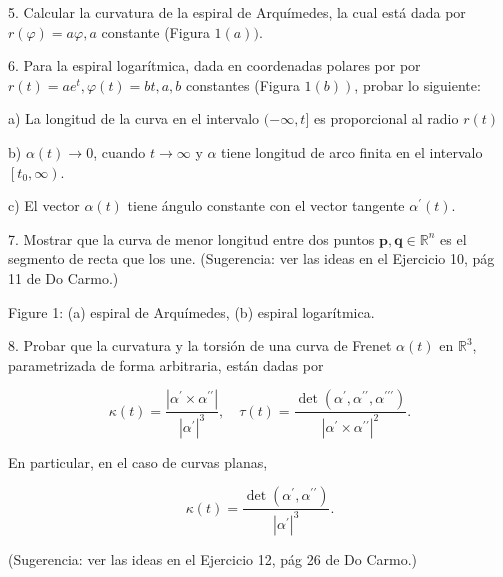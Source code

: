 \begin{problema}

5. Calcular la curvatura de la espiral de Arquímedes, la cual está dada por $r(\varphi)=a \varphi, a$ constante (Figura $1(a))$.
\end{problema}

\begin{problema}

6. Para la espiral logarítmica, dada en coordenadas polares por por $r(t)=a e^{t}, \varphi(t)=b t, a, b$ constantes (Figura $\left.1(b)\right)$, probar lo siguiente:

a) La longitud de la curva en el intervalo $(-\infty, t]$ es proporcional al radio $r(t)$

b) $\alpha(t) \rightarrow 0$, cuando $t \rightarrow \infty$ y $\alpha$ tiene longitud de arco finita en el intervalo $\left[t_{0}, \infty\right)$.

c) El vector $\alpha(t)$ tiene ángulo constante con el vector tangente $\alpha^{\prime}(t)$.


\end{problema}

\begin{problema}
    7. Mostrar que la curva de menor longitud entre dos puntos $\mathbf{p}, \mathbf{q} \in \mathbb{R}^{n}$ es el segmento de recta que los une. (Sugerencia: ver las ideas en el Ejercicio 10, pág 11 de Do Carmo.) 


Figure 1: (a) espiral de Arquímedes, (b) espiral logarítmica.

\end{problema}

\begin{problema}


8. Probar que la curvatura y la torsión de una curva de Frenet $\alpha(t)$ en $\mathbb{R}^{3}$, parametrizada de forma arbitraria, están dadas por

$$
\kappa(t)=\frac{\left|\alpha^{\prime} \times \alpha^{\prime \prime}\right|}{\left|\alpha^{\prime}\right|^{3}}, \quad \tau(t)=\frac{\operatorname{det}\left(\alpha^{\prime}, \alpha^{\prime \prime}, \alpha^{\prime \prime \prime}\right)}{\left|\alpha^{\prime} \times \alpha^{\prime \prime}\right|^{2}} .
$$

En particular, en el caso de curvas planas,

$$
\kappa(t)=\frac{\operatorname{det}\left(\alpha^{\prime}, \alpha^{\prime \prime}\right)}{\left|\alpha^{\prime}\right|^{3}} .
$$

(Sugerencia: ver las ideas en el Ejercicio 12, pág 26 de Do Carmo.)
\end{problema}

